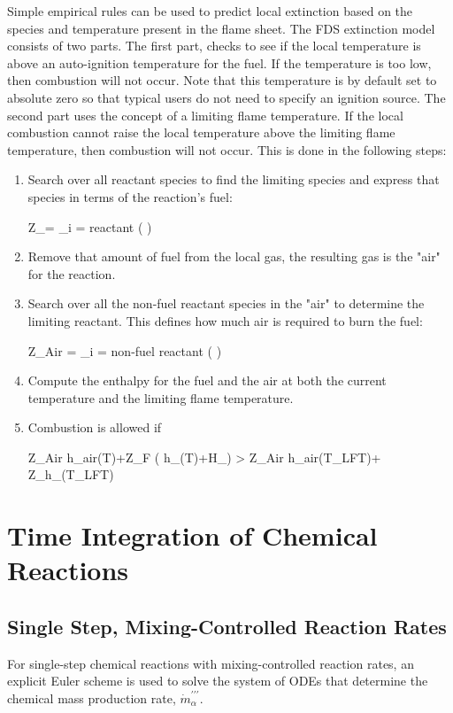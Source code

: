 Simple empirical rules can be used to predict local
extinction based on the species and temperature present in the flame sheet.  The FDS extinction model consists of two parts. The first part, checks to see if the local temperature is above an auto-ignition temperature for the fuel.  If the temperature is too low, then combustion will not occur.  Note that this temperature is by default set to absolute zero so that typical users do not need to specify an ignition source.  The second part uses the concept of a limiting flame temperature.  If the local combustion cannot raise the local temperature above the limiting flame temperature, then combustion will not occur.  This is done in the following steps:

\begin{enumerate}
\item Search over all reactant species to find the limiting species and express that species in terms of the reaction's fuel:

\be \Delta Z_\F = \min_{i \; = \; reactant} \left( \right) \ee
\item Remove that amount of fuel from the local gas, the resulting gas is the "air" for the reaction.
\item Search over all the non-fuel reactant species in the "air" to determine the limiting reactant.  This defines how much air is required to burn the fuel:

\be \Delta Z_{Air} = \min_{i \; = \; non-fuel \; reactant} \left( \right) \ee

\item Compute the enthalpy for the fuel and the air at both the current temperature and the limiting flame temperature.
\item Combustion is allowed if 

\be \Delta Z_{Air} h_{air}(T)+\Delta Z_F \left( h_\F(T)+\Delta H_\F \right) > \Delta Z_{Air} h_{air}(T_{LFT})+ \Delta Z_\F h_\F(T_{LFT}) \ee

\end{enumerate}

\section{Time Integration of Chemical Reactions}

\subsection{Single Step, Mixing-Controlled Reaction Rates}
For single-step chemical reactions with mixing-controlled reaction rates, an explicit Euler scheme is used to solve the system of ODEs that determine the chemical mass production rate, $\dot{m}^{\prime\prime\prime}_{\alpha}$.   


